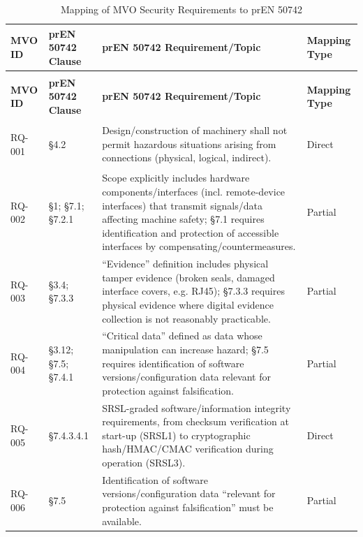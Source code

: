 \begin{longtable}{|>{\bfseries}p{1cm}|p{2.5cm}|p{9cm}|>{\centering\arraybackslash}p{2cm}|}
	\caption{Mapping of MVO Security Requirements to prEN 50742} 
	\label{tab:pren50742-mapping} \\
	\hline
	\textbf{MVO ID} & \textbf{prEN 50742 Clause} & \textbf{prEN 50742 Requirement/Topic} & \textbf{Mapping Type} \\
	\hline
	\endfirsthead
	
	\multicolumn{4}{c}{\tablename\ \thetable{} continued from previous page} \\
	\hline
	\textbf{MVO ID} & \textbf{prEN 50742 Clause} & \textbf{prEN 50742 Requirement/Topic} & \textbf{Mapping Type} \\
	\hline
	\endhead
	
	\hline
	\endlastfoot
	
	RQ-001 &
	\S4.2 &
	Design/construction of machinery shall not permit hazardous situations arising from connections (physical, logical, indirect). &
	Direct \\
	\hline
	
	RQ-002 &
	\S1; \S7.1; \S7.2.1 &
	Scope explicitly includes hardware components/interfaces (incl. remote-device interfaces) that transmit signals/data affecting machine safety; \S7.1 requires identification and protection of accessible interfaces by compensating/countermeasures. &
	Partial \\
	\hline
	
	RQ-003 &
	\S3.4; \S7.3.3 &
	``Evidence'' definition includes physical tamper evidence (broken seals, damaged interface covers, e.g. RJ45); \S7.3.3 requires physical evidence where digital evidence collection is not reasonably practicable. &
	Partial \\
	\hline
	
	RQ-004 &
	\S3.12; \S7.5; \S7.4.1 &
	``Critical data'' defined as data whose manipulation can increase hazard; \S7.5 requires identification of software versions/configuration data relevant for protection against falsification. &
	Partial \\
	\hline
	
	RQ-005 &
	\S7.4.3.4.1 &
	SRSL-graded software/information integrity requirements, from checksum verification at start-up (SRSL1) to cryptographic hash/HMAC/CMAC verification during operation (SRSL3). &
	Direct \\
	\hline
	
	RQ-006 &
	\S7.5 &
	Identification of software versions/configuration data ``relevant for protection against falsification'' must be available. &
	Partial \\
	\hline
	

\end{longtable}
